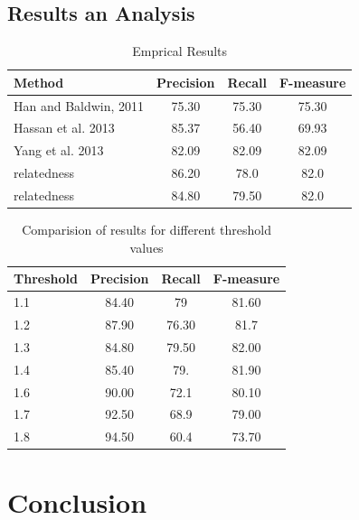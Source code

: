 \documentclass[preprint,review,12pt]{elsarticle}
\begin{document}
\subsection{Results an Analysis}

\begin{table}[thb]
  \centering
  \begin{tabular}[t]{lccc}
    \hline
    Method & Precision & Recall & F-measure \\
    \hline
    Han and Baldwin, 2011 & 75.30 & 75.30 & 75.30 \\
    Hassan et al. 2013 & 85.37 & 56.40 & 69.93 \\
    Yang et al. 2013 & 82.09 & 82.09 & 82.09 \\
    relatedness    & 86.20 & 78.0 & 82.0 \\
    relatedness     & 84.80 & 79.50 & 82.0 \\
    \hline
  \end{tabular}
  \caption{Emprical Results}
  \label{tab:results}
\end{table}

\begin{table}[thb]
  \centering
  \begin{tabular}[th]{lccc}
    \hline
    Threshold & Precision & Recall & F-measure \\
    \hline
    1.1 & 84.40 & 79 & 81.60 \\
    1.2 & 87.90 & 76.30 & 81.7 \\
    1.3 & 84.80 & 79.50 & 82.00 \\
    1.4 & 85.40 & 79. & 81.90 \\
    1.6 & 90.00 & 72.1 & 80.10 \\
    1.7 & 92.50 & 68.9 & 79.00 \\
    1.8 & 94.50 & 60.4 & 73.70 \\
    \hline
  \end{tabular}
  \caption{Comparision of results for different threshold values}
  \label{tab:thresholds}
\end{table}

\section{Conclusion}







\end{document}
